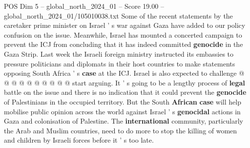 \begin{textsample}{POS Dim 5 – global\_north\_2024\_01 – Score 19.00 – global\_north\_2024\_01/105010038.txt}
Some of the recent statements by the caretaker prime minister on Israel ' s war against Gaza have added to our policy confusion on the issue.
Meanwhile, Israel has mounted a concerted campaign to prevent the ICJ from concluding that it has indeed committed \textbf{genocide} in the Gaza Strip.
Last week the Israeli foreign ministry instructed its embassies to pressure politicians and diplomats in their host countries to make statements opposing South Africa ' s \textbf{case} at the ICJ.
Israel is also expected to challenge @ @ @ @ @ @ @ @ @ @ start arguing.
It ' s going to be a lengthy process of \textbf{legal} battle on the issue and there is no indication that it could prevent the \textbf{genocide} of Palestinians in the occupied territory.
But the South \textbf{African} \textbf{case} will help mobilise public opinion across the world against Israel ' s \textbf{genocidal} actions in Gaza and colonisation of Palestine.
The \textbf{international} community, particularly the Arab and Muslim countries, need to do more to stop the killing of women and children by Israeli forces before it ' s too late.

\end{textsample}
